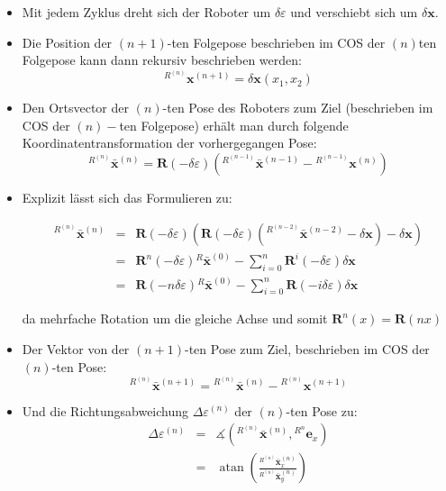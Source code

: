 \documentclass[10pt,a4paper]{article}
\DeclareMathOperator{\atan}{atan}
\begin{document}
\begin{itemize}
	\item Mit jedem Zyklus dreht sich der Roboter um $\delta \varepsilon$ und verschiebt sich um $\delta \bm{x}$.

	\item Die Position der $(n+1)$-ten Folgepose beschrieben im COS der $(n)$ten Folgepose kann dann rekursiv beschrieben werden:
	\begin{equation}
	{^{R^{(n)}}}\bm{x}^{(n+1)} = \delta \bm{x}(x_1,x_2)
	\end{equation}
	
	\item Den Ortsvector der $(n)$-ten Pose des Roboters zum Ziel (beschrieben im COS der $(n)-$ten Folgepose) erhält man durch folgende Koordinatentransformation der vorhergegangen Pose:
	\begin{equation}
	{^{R^{(n)}}}\bar{\bm{x}}^{(n)} = \bm{R}(-\delta\varepsilon)\left({^{R^{(n-1)}}}\bar{\bm{x}}^{(n-1)}-{^{R^{(n-1)}}}\bm{x}^{(n)}\right)
	\end{equation}
	\item Explizit lässt sich das Formulieren zu:

	\begin{eqnarray}
	{^{R^{(n)}}}\bar{\bm{x}}^{(n)} &=& 
	\bm{R}(-\delta\varepsilon)\left(
	\bm{R}(-\delta\varepsilon) \left( {^{R^{(n-2)}}}\bar{\bm{x}}^{(n-2)} - \delta\bm{x}\right)
	-\delta\bm{x}\right) \\
	&=& 
	\bm{R}^n(-\delta\varepsilon){^R}\bar{\bm{x}}^{(0)} - \sum_{i=0}^n \bm{R}^i(-\delta\varepsilon) \delta \bm{x} \\
	&=& 
	\bm{R}(-n \delta\varepsilon){^R}\bar{\bm{x}}^{(0)} - \sum_{i=0}^n \bm{R}(- i \delta\varepsilon) \delta \bm{x}
	\end{eqnarray}
	
	da mehrfache Rotation um die gleiche Achse und somit $\bm{R}^n(x) = \bm{R}(nx)$

	\item Der Vektor von der $(n+1)$-ten Pose zum Ziel, beschrieben im COS der $(n)$-ten Pose:
	\begin{equation}
	{^{R^{(n)}}}\bar{\bm{x}}^{(n+1)} = {^{R^{(n)}}}\bar{\bm{x}}^{(n)} - {^{R^{(n)}}}\bm{x}^{(n+1)}
	\end{equation}

	\item Und die Richtungsabweichung $\Delta \varepsilon^{(n)}$ der $(n)$-ten Pose zu:
	\begin{eqnarray}
	\Delta \varepsilon^{(n)} 
	&=& \measuredangle \left( {^{R^{(n)}}}\bar{\bm{x}}^{(n)} , {^{R^{n}}}\bm{e}_x \right) \\
	&=& \atan \left(
	\frac{	{^{R^{(n)}}}\bar{\bm{x}}^{(n)}_x }{
	{^{R^{(n)}}}\bar{\bm{x}}^{(n)}_y}
	\right)
	\end{eqnarray}	
	
\end{itemize}
\end{document}
